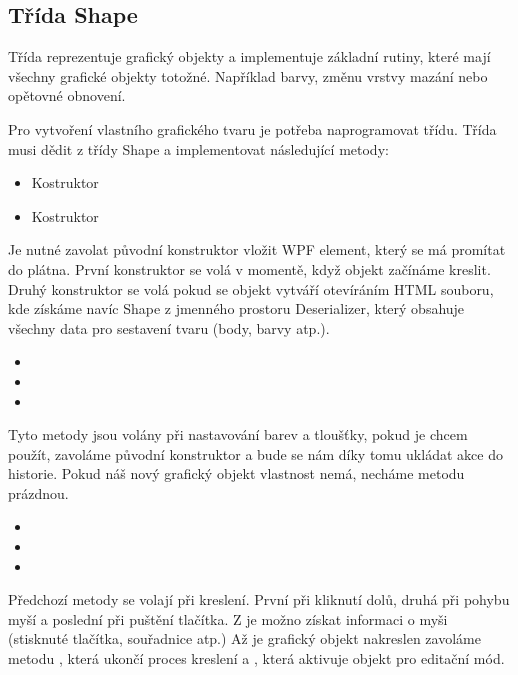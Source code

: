 \documentclass[
  field=inf,
  biblatex,
  glossaries,
  index
]{kidiplom}
\begin{document}
\subsection{Třída Shape}

Třída reprezentuje grafický objekty a implementuje základní rutiny, které mají všechny grafické objekty totožné. Například barvy, změnu vrstvy mazání nebo opětovné obnovení.

Pro vytvoření vlastního grafického tvaru je potřeba naprogramovat třídu. Třída musi dědit z třídy Shape a implementovat následující metody:

\begin{itemize}
\item Kostruktor 
\item Kostruktor 
\end{itemize}
Je nutné zavolat původní konstruktor vložit WPF element, který se má promítat do plátna. První konstruktor se volá v momentě, když objekt začínáme kreslit. Druhý konstruktor se volá pokud se objekt vytváří otevíráním HTML souboru, kde získáme navíc Shape z jmenného prostoru Deserializer, který obsahuje všechny data pro sestavení tvaru (body, barvy atp.).

\begin{itemize}
\item {}
\item {}
\item {}
\end{itemize}
Tyto metody jsou volány při nastavování barev a tloušťky, pokud je chcem použít, zavoláme původní konstruktor  a bude se nám díky tomu ukládat akce do historie. Pokud náš nový grafický objekt vlastnost nemá, necháme metodu prázdnou.

\begin{itemize}
\item {}
\item {}
\item {}
\end{itemize}
Předchozí metody se volají při kreslení. První při kliknutí dolů, druhá při pohybu myší a poslední při puštění tlačítka. Z  je možno získat informaci o myši (stisknuté tlačítka, souřadnice atp.) Až je grafický objekt nakreslen zavoláme metodu , která ukončí proces kreslení a , která aktivuje objekt pro editační mód.
\end{document}
